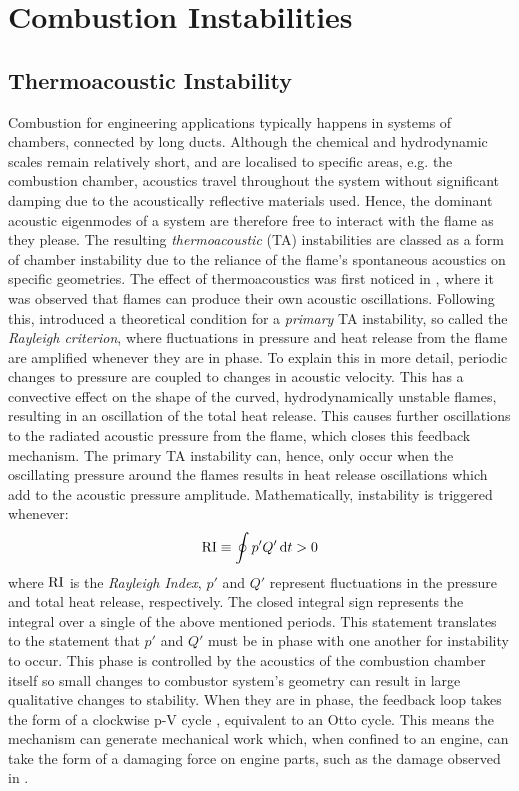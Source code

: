 \section{Combustion Instabilities}

\subsection{Thermoacoustic Instability}


Combustion for engineering applications typically happens in systems of chambers, connected by long ducts. Although the chemical and hydrodynamic scales remain relatively short, and are localised to specific areas, e.g. the combustion chamber, acoustics travel throughout the system without significant damping due to the acoustically reflective materials used. Hence, the dominant acoustic eigenmodes of a system are therefore free to interact with the flame as they please. The resulting \emph{thermoacoustic} (TA) instabilities are classed as a form of chamber instability due to the reliance of the flame's spontaneous acoustics on specific geometries. The effect of thermoacoustics was first noticed in \cite{mallard1883RecherchesExperimentalesTheoriques}, where it was observed that flames can produce their own acoustic oscillations. Following this, \cite{rayleigh1896TheorySound} introduced a theoretical condition for a \emph{primary} TA instability, so called the \emph{Rayleigh criterion}, where fluctuations in pressure and heat release from the flame are amplified whenever they are in phase. To explain this in more detail, periodic changes to pressure are coupled to changes in acoustic velocity. This has a convective effect on the shape of the curved, hydrodynamically unstable \cite{darrieus1945PropagationFrontFlamme,landau1944TheorySlowCombustion,matalon2018DarrieusLandauInstability} flames, resulting in an oscillation of the total heat release. This causes further oscillations to the radiated acoustic pressure from the flame, which closes this feedback mechanism. The primary TA instability can, hence, only occur when the oscillating pressure around the flames results in heat release oscillations which add to the acoustic pressure amplitude. Mathematically, instability is triggered whenever:
\begin{equation}
\rm{RI} \equiv \oint p' Q' \dd{t} > 0
\end{equation}
where $\rm{RI}$ is the \emph{Rayleigh Index}, $p'$ and $Q'$ represent fluctuations in the pressure and total heat release, respectively. The closed integral sign represents the integral over a single of the above mentioned periods. This statement translates to the statement that $p'$ and $Q'$ must be in phase with one another for instability to occur. This phase is controlled by the acoustics of the combustion chamber itself so small changes to combustor system's geometry can result in large qualitative changes to stability. When they are in phase, the feedback loop takes the form of a clockwise p-V cycle \cite{polifke2004CombustionInstabilities}, equivalent to an Otto cycle. This means the mechanism can generate mechanical work which, when confined to an engine, can take the form of a damaging force on engine parts, such as the damage observed in \cite{lieuwen2006CombustionInstabilitiesGas}.

